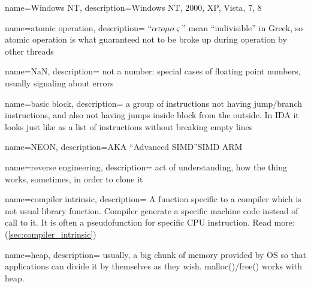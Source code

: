 {
  name=Windows NT,
  description={Windows NT, 2000, XP, Vista, 7, 8}
}

{
  name=atomic operation,
  description={
  ``$\alpha{}\tau{}o\mu{}o\varsigma{}$''
  {mean ``indivisible'' in Greek, so atomic operation is what guaranteed not
  to be broke up during operation by other threads}}
}

{
  name=NaN,
  description={
	{not a number: special cases of floating point numbers, usually signaling about errors}
  }
}

{
  name=basic block,
  description={
	{a group of instructions not having jump/branch instructions, and also not having
	jumps inside block from the outside.
	In IDA it looks just like as a list of instructions without breaking empty lines}
  }
}

{
  name=NEON,
  description={\ac{AKA} ``Advanced SIMD''\EMDASH\ac{SIMD}  ARM}
}

{
  name=reverse engineering,
  description={
  {act of understanding, how the thing works, sometimes, in order to clone it}}
}

{
  name=compiler intrinsic,
  description={
	{A function specific to a compiler which is not usual library function.
	Compiler generate a specific machine code instead of call to it.
	It is often a pseudofunction for specific \ac{CPU} instruction. Read more:} (\ref{sec:compiler_intrinsic})}
}

{
  name=heap,
  description={
  {usually, a big chunk of memory provided by \ac{OS} so that applications can divide it by themselves as they wish.
  malloc()/free() works with heap.}}
}

